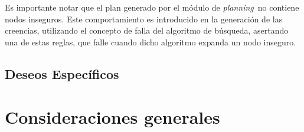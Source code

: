\documentclass[oneside]{book}
\begin{document}
Es importante notar que el plan generado por el módulo de \textit{planning}\ no contiene
nodos inseguros. Este comportamiento es introducido en la generación de las creencias,
utilizando el concepto de falla del algoritmo de búsqueda, asertando una de estas reglas,
que falle cuando dicho algoritmo expanda un nodo inseguro.


\section{Deseos Específicos}

%
%





\chapter{Consideraciones generales}
\end{document}

